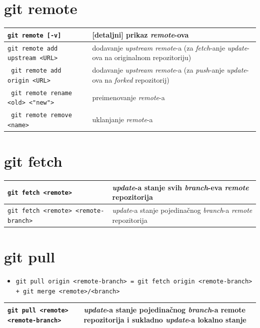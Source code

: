 \documentclass[10pt]{article}
\begin{document}
    \section*{\color{BrickRed} git remote}
    \begin{tabular}{|>{\tt}p{9.00cm}|>{}p{15.50cm}|}
        \hline
        git remote [-v]                                 & [detaljni] prikaz \textit{remote}-ova \\ \hline
        git remote add upstream <URL>                   & dodavanje \textit{upstream remote}-a (za \textit{fetch}-anje \textit{update}-ova na originalnom repozitoriju) \\ \hline
        git remote add origin <URL>                     & dodavanje \textit{upstream remote}-a (za \textit{push}-anje \textit{update}-ova na \textit{forked} repozitorij) \\ \hline
        git remote rename <old> <"new">                 & preimenovanje \textit{remote}-a \\ \hline  
        git remote remove <name>                        & uklanjanje \textit{remote}-a \\ \hline                 
    \end{tabular}

    \section*{\color{BrickRed} git fetch}
    \begin{tabular}{|>{\tt}p{9.00cm}|>{}p{15.50cm}|}
        \hline
        git fetch <remote>                              & \textit{update}-a stanje svih \textit{branch}-eva \textit{remote} repozitorija \\ \hline
        git fetch <remote> <remote-branch>              & \textit{update}-a stanje pojedinačnog \textit{branch}-a \textit{remote} repozitorija \\ \hline                
    \end{tabular}

    \section*{\color{BrickRed} git pull}
    \begin{itemize}
        \item \texttt{git pull origin <remote-branch> = git fetch origin <remote-branch> + git merge <remote>/<branch>}
    \end{itemize}
    \begin{tabular}{|>{\tt}p{9.00cm}|>{}p{15.50cm}|}
        \hline
        git pull <remote> <remote-branch>               & \textit{update}-a stanje pojedinačnog \textit{branch}-a remote repozitorija i sukladno \textit{update}-a lokalno stanje \\ \hline                
    \end{tabular}
\end{document}
